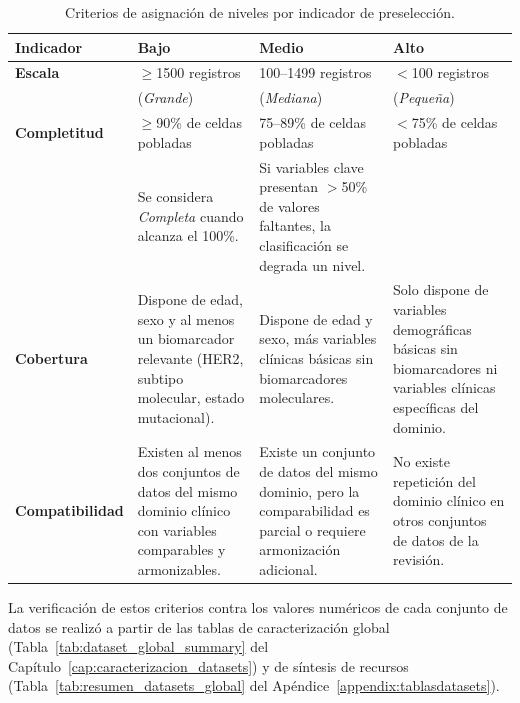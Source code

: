 \begin{table}[htbp]
\centering
\caption{Criterios de asignación de niveles por indicador de preselección.}
\label{tab:criterios_preseleccion}
\small
\setlength{\tabcolsep}{5pt}
\begin{tabular}{p{2.5cm} p{3.8cm} p{3.8cm} p{3.8cm}}
\toprule
\textbf{Indicador} & \textbf{Bajo} & \textbf{Medio} & \textbf{Alto} \\
\midrule

\textbf{Escala} &
$\geq$1500 registros &
100--1499 registros &
$<$100 registros \\
& (\textit{Grande}) & (\textit{Mediana}) & (\textit{Pequeña}) \\
\addlinespace

\textbf{Completitud} &
$\geq$90\% de celdas pobladas &
75--89\% de celdas pobladas &
$<$75\% de celdas pobladas \\
& Se considera \textit{Completa} cuando alcanza el 100\%. &
Si variables clave presentan $>$50\% de valores faltantes, la clasificación se degrada un nivel. &
\\
\addlinespace

\textbf{Cobertura} &
Dispone de edad, sexo y al menos un biomarcador relevante (HER2, subtipo molecular, estado mutacional). &
Dispone de edad y sexo, más variables clínicas básicas sin biomarcadores moleculares. &
Solo dispone de variables demográficas básicas sin biomarcadores ni variables clínicas específicas del dominio. \\
\addlinespace

\textbf{Compatibilidad} &
Existen al menos dos conjuntos de datos del mismo dominio clínico con variables comparables y armonizables. &
Existe un conjunto de datos del mismo dominio, pero la comparabilidad es parcial o requiere armonización adicional. &
No existe repetición del dominio clínico en otros conjuntos de datos de la revisión. \\
\bottomrule
\end{tabular}
\end{table}

La verificación de estos criterios contra los valores numéricos de cada conjunto de datos se realizó a partir de las tablas de caracterización global (Tabla~\ref{tab:dataset_global_summary} del Capítulo~\ref{cap:caracterizacion_datasets}) y de síntesis de recursos (Tabla~\ref{tab:resumen_datasets_global} del Apéndice~\ref{appendix:tablasdatasets}).

